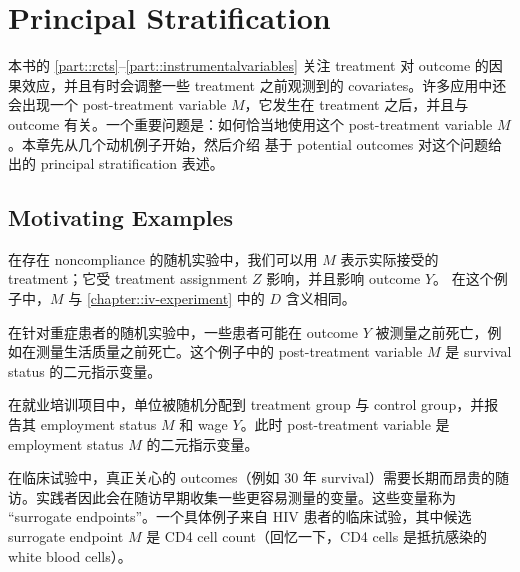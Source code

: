 
\chapter{Principal Stratification}
 \label{chapter::principal-stratification}

本书的 \cref{part::rcts}--\cref{part::instrumentalvariables} 关注 treatment 对 outcome 的因果效应，并且有时会调整一些 treatment 之前观测到的 covariates。许多应用中还会出现一个 post-treatment variable $M$，它发生在 treatment 之后，并且与 outcome 有关。一个重要问题是：如何恰当地使用这个 post-treatment variable $M$。本章先从几个动机例子开始，然后介绍 \citet{frangakis2002principal} 基于 potential outcomes 对这个问题给出的 principal stratification 表述。
 


\section{Motivating Examples}



\begin{example}[noncompliance]\label{eg::noncompliance}
在存在 noncompliance 的随机实验中，我们可以用 $M$ 表示实际接受的 treatment；它受 treatment assignment $Z$ 影响，并且影响 outcome $Y$。
在这个例子中，$M$ 与 \cref{chapter::iv-experiment} 中的 $D$ 含义相同。
\end{example}


\begin{example}\label{eq::truncationbydeath}
在针对重症患者的随机实验中，一些患者可能在 outcome $Y$ 被测量之前死亡，例如在测量生活质量之前死亡。这个例子中的 post-treatment variable $M$ 是 survival status 的二元指示变量。
\end{example}




\begin{example}[unemployment]\label{eg::unemployment}
在就业培训项目中，单位被随机分配到 treatment group 与 control group，并报告其 employment status $M$ 和 wage $Y$。此时 post-treatment variable 是 employment status $M$ 的二元指示变量。
\end{example}




\begin{example}
\label{eg::surrogate-endpoints}
在临床试验中，真正关心的 outcomes（例如 30 年 survival）需要长期而昂贵的随访。实践者因此会在随访早期收集一些更容易测量的变量。这些变量称为 ``surrogate endpoints''。一个具体例子来自 HIV 患者的临床试验，其中候选 surrogate endpoint $M$ 是 CD4 cell count（回忆一下，CD4 cells 是抵抗感染的 white blood cells）。
\end{example}



